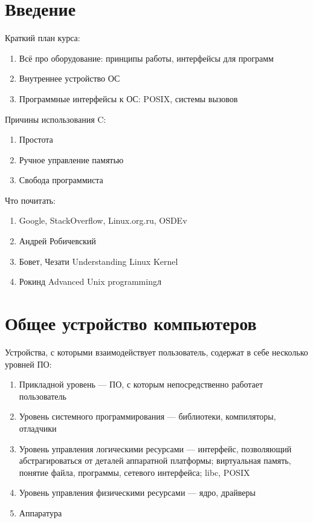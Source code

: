 \documentclass[main]{subfiles}
\begin{document}
\chapter{Введение}
Краткий план курса:
\begin{enumerate}
\item Всё про оборудование: принципы работы, интерфейсы для программ
\item Внутреннее устройство ОС
\item Программные интерфейсы к ОС: POSIX, системы вызовов
\end{enumerate}


Причины использования C:
\begin{enumerate}
\item Простота
\item Ручное управление памятью
\item Свобода программиста
\end{enumerate}

Что почитать:
\begin{enumerate}
\item Google, StackOverflow, Linux.org.ru, OSDEv
\item Андрей Робичевский
\item Бовет, Чезати Understanding Linux Kernel
\item Рокинд Advanced Unix programmingл
\end{enumerate}

\chapter{Общее устройство компьютеров}
Устройства, с которыми взаимодействует пользователь, содержат в себе
несколько уровней ПО:
\begin{enumerate}
\item Прикладной уровень --- ПО, с которым непосредственно работает пользователь
\item Уровень системного программирования --- библиотеки, компиляторы, отладчики
\item Уровень управления логическими ресурсами --- интерфейс, позволяющий абстрагироваться
от деталей аппаратной платформы; виртуальная память, понятие файла, программы, сетевого
интерфейса; libc, POSIX
\item Уровень управления физическими ресурсами --- ядро, драйверы
\item Аппаратура
\end{enumerate}
\end{document}
